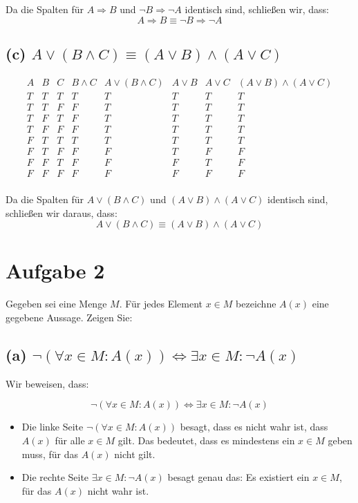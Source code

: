 \documentclass[11pt]{article}
\begin{document}
Da die Spalten für \( A \Rightarrow B \) und \( \neg B \Rightarrow \neg A \) identisch sind, schließen wir, dass:
\[
A \Rightarrow B \equiv \neg B \Rightarrow \neg A
\]

\subsection*{(c) \( A \lor (B \land C) \equiv (A \lor B) \land (A \lor C) \)}


\[
\begin{array}{|c|c|c|c|c|c|c|c|}
A & B & C & B \land C & A \lor (B \land C) & A \lor B & A \lor C & (A \lor B) \land (A \lor C) \\
\hline
T & T & T & T & T & T & T & T \\
T & T & F & F & T & T & T & T \\
T & F & T & F & T & T & T & T \\
T & F & F & F & T & T & T & T \\
F & T & T & T & T & T & T & T \\
F & T & F & F & F & T & F & F \\
F & F & T & F & F & F & T & F \\
F & F & F & F & F & F & F & F \\
\end{array}
\]

Da die Spalten für \( A \lor (B \land C) \) und \( (A \lor B) \land (A \lor C) \) identisch sind, schließen wir daraus, dass:
\[
A \lor (B \land C) \equiv (A \lor B) \land (A \lor C)
\]

    \section*{Aufgabe 2}

Gegeben sei eine Menge \( M \). Für jedes Element \( x \in M \) bezeichne \( A(x) \) eine gegebene Aussage. Zeigen Sie:

\subsection*{(a) \( \neg (\forall x \in M : A(x)) \iff \exists x \in M : \neg A(x) \)}

Wir beweisen, dass:

\[
\neg (\forall x \in M : A(x)) \iff \exists x \in M : \neg A(x)
\]

\begin{itemize}
    \item Die linke Seite \( \neg (\forall x \in M : A(x)) \) besagt, dass es nicht wahr ist, dass \( A(x) \) für alle \( x \in M \) gilt. Das bedeutet, dass es mindestens ein \( x \in M \) geben muss, für das \( A(x) \) nicht gilt.
    \item Die rechte Seite \( \exists x \in M : \neg A(x) \) besagt genau das: Es existiert ein \( x \in M \), für das \( A(x) \) nicht wahr ist.
\end{itemize}
\end{document}

